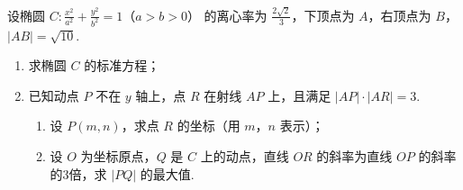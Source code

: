 \documentclass[UTF8,a4paper,oneside,11pt]{ctexbook}
\begin{document}
\begin{problem}
设椭圆 \(C: \frac{x^2}{a^2} + \frac{y^2}{b^2} = 1\)（\(a > b > 0\)） 的离心率为 \(\frac{2\sqrt{2}}{3}\)，下顶点为 \(A\)，右顶点为 \(B\)，\(|AB| = \sqrt{10}\).

\begin{enumerate}
\item 求椭圆 \(C\) 的标准方程；
\item 已知动点 \(P\) 不在 \(y\) 轴上，点 \(R\) 在射线 \(AP\) 上，且满足 \(|AP| \cdot |AR| = 3\).
\begin{enumerate}
\item 设 \(P(m, n)\)，求点 \(R\) 的坐标（用 \(m\)，\(n\) 表示）；
\item 设 \(O\) 为坐标原点，\(Q\) 是 \(C\) 上的动点，直线 \(OR\) 的斜率为直线 \(OP\) 的斜率的3倍，求 \(|PQ|\) 的最大值.
\end{enumerate}
\end{enumerate}
\end{problem}
\end{document}
